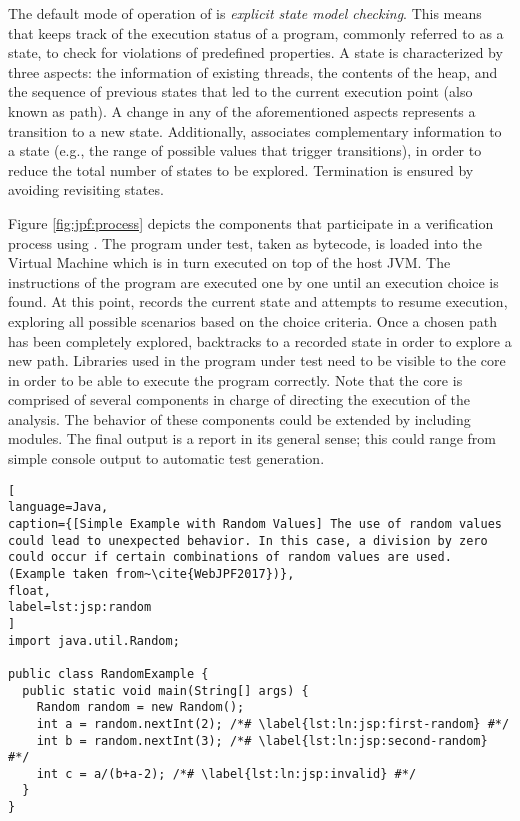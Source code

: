 The default mode of operation of \jpf{} is \textit{explicit state model checking}. This means that \jpf{} keeps track of the execution status of a program, commonly referred to as a state, to check for violations of predefined properties. A state is characterized by three aspects: the information of existing threads, the contents of the heap, and the sequence of previous states that led to the current execution point (also known as path). A change in any of the aforementioned aspects represents a transition to a new state. Additionally, \jpf{} associates complementary information to a state (e.g., the range of possible values that trigger transitions), in order to reduce the total number of states to be explored. Termination is ensured by avoiding revisiting states.

Figure \ref{fig:jpf:process} depicts the components that participate in a verification process using \jpf{}. The program under test, taken as bytecode, is loaded into the \jpf{} Virtual Machine which is in turn executed on top of the host JVM. The instructions of the program are executed one by one until an execution choice is found. At this point, \jpf{} records the current state and attempts to resume execution, exploring all possible scenarios based on the choice criteria. Once a chosen path has been completely explored, \jpf{} backtracks to a recorded state in order to explore a new path. Libraries used in the program under test need to be visible to the core in order to be able to execute the program correctly. Note that the core is comprised of several components in charge of directing the execution of the analysis. The behavior of these components could be extended by including modules. The final output is a report in its general sense; this could range from simple console output to automatic test generation.

\begin{lstlisting}[
language=Java,
caption={[Simple Example with Random Values] The use of random values could lead to unexpected behavior. In this case, a division by zero could occur if certain combinations of random values are used. (Example taken from~\cite{WebJPF2017})},
float,
label=lst:jsp:random
]
import java.util.Random;

public class RandomExample {
  public static void main(String[] args) {
    Random random = new Random();
    int a = random.nextInt(2); /*# \label{lst:ln:jsp:first-random} #*/
    int b = random.nextInt(3); /*# \label{lst:ln:jsp:second-random} #*/
    int c = a/(b+a-2); /*# \label{lst:ln:jsp:invalid} #*/
  }
}
\end{lstlisting}

